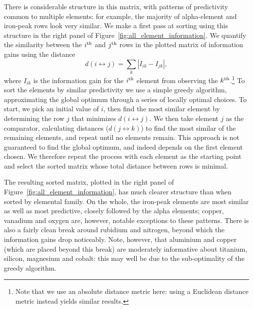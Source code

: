 \documentclass[a4paper,fleqn,usenatbib]{mnras}
\begin{document}
There is considerable structure in this matrix, with patterns of predictivity common to multiple elements: for example, the majority of alpha-element and iron-peak rows look very similar. We make a first pass at sorting using this structure in the right panel of Figure~\ref{fig:all_element_information}. We quantify the similarity between the $i^{\rm th}$ and $j^{\rm th}$ rows in the plotted matrix of information gains using the distance
\begin{equation}
d(i \leftrightarrow j) = \sum_k |I_{ik} - I_{jk}|,
\end{equation}
where $I_{ik}$ is the information gain for the $i^{\rm th}$ element from observing the $k^{\rm th}$.\footnote{Note that we use an absolute distance metric here: using a Euclidean distance metric instead yields similar results.} To sort the elements by similar predictivity we use a simple greedy algorithm, approximating the global optimum through a series of locally optimal choices. To start, we pick an initial value of $i$, then find the most similar element by determining the row $j$ that minimizes $d(i \leftrightarrow j)$. We then take element $j$ as the comparator, calculating distances ($d(j \leftrightarrow k)$) to find the most similar of the remaining elements, and repeat until no elements remain. This approach is not guaranteed to find the global optimum, and indeed depends on the first element chosen. We therefore repeat the process with each element as the starting point and select the sorted matrix whose total distance between rows is minimal.

The resulting sorted matrix, plotted in the right panel of Figure~\ref{fig:all_element_information}, has much clearer structure than when sorted by elemental family. On the whole, the iron-peak elements are most similar as well as most predictive, closely followed by the alpha elements; copper, vanadium and oxygen are, however, notable exceptions to these patterns. There is also a fairly clean break around rubidium and nitrogen, beyond which the information gains drop noticeably. Note, however, that aluminium and copper (which are placed beyond this break) are moderately informative about titanium, silicon, magnesium and cobalt: this may well be due to the sub-optimality of the greedy algorithm.
\end{document}
